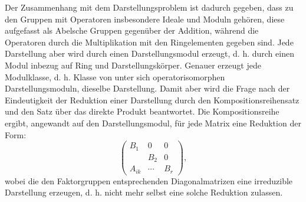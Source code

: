Der Zusammenhang mit dem Darstellungsproblem ist dadurch gegeben, dass zu den Gruppen mit Operatoren insbesondere Ideale und Moduln gehören, diese aufgefasst als Abelsche Gruppen gegenüber der Addition, während die Operatoren durch die Multiplikation mit den Ringelementen gegeben sind. Jede Darstellung aber wird durch einen Darstellungsmodul erzeugt, d. h. durch einen Modul inbezug auf Ring und Darstellungskörper. Genauer erzeugt jede Modulklasse, d. h. Klasse von unter sich operatorisomorphen Darstellungsmoduln, dieselbe Darstellung. Damit aber wird die Frage nach der Eindeutigkeit der Reduktion einer Darstellung durch den Kompositionsreihensatz und den Satz über das direkte Produkt beantwortet. Die Kompositionsreihe ergibt, angewandt auf den Darstellungsmodul, für jede Matrix eine Reduktion der Form:
\[
\begin{pmatrix}
B_1&0&0\\
&B_2&0\\
A_{ik}&\cdots&B_r
\end{pmatrix},
\]
wobei die den Faktorgruppen entsprechenden Diagonalmatrizen eine \guillemotleft irreduzible\guillemotright{} Darstellung erzeugen, d. h. nicht mehr selbst eine solche Reduktion zulassen.
